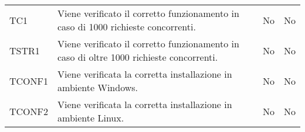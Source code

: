 \begin{longtable}{
		>{\centering}p{}
		>{}p{}
		>{\centering}p{}
		>{\centering}p{} }
		TC1 & Viene verificato il corretto funzionamento in caso di 1000 richieste concorrenti. &
		No &
		No \tabularnewline
		



		TSTR1 & Viene verificato il corretto funzionamento in caso di oltre 1000 richieste concorrenti. &
		No &
		No \tabularnewline
		
		
		
		
		TCONF1 & Viene verificata la corretta installazione in ambiente Windows. &
		No &
		No \tabularnewline
		
		TCONF2 & Viene verificata la corretta installazione in ambiente Linux. &
		No &
		No \tabularnewline


\end{longtable}
